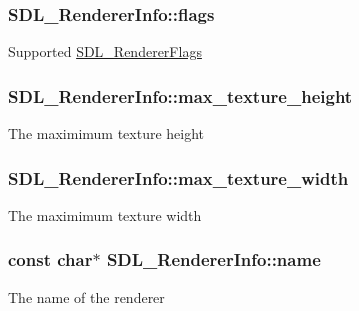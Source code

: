 \subsubsection[{flags}]{ S\+D\+L\+\_\+\+Renderer\+Info\+::flags}\label{struct_s_d_l___renderer_info_a95cf0ffd1704fd0a4dd8ceac6c9f0542}
Supported \hyperlink{_s_d_l__render_8h_a3a6e51bbee5fd3f8ee0c9f7504ae4130}{S\+D\+L\+\_\+\+Renderer\+Flags} \hypertarget{struct_s_d_l___renderer_info_a87c6a13e8d535c2148f8913c05e13102}{}
\subsubsection[{max\+\_\+texture\+\_\+height}]{ S\+D\+L\+\_\+\+Renderer\+Info\+::max\+\_\+texture\+\_\+height}\label{struct_s_d_l___renderer_info_a87c6a13e8d535c2148f8913c05e13102}
The maximimum texture height \hypertarget{struct_s_d_l___renderer_info_a6e6757e3d5c1f0922adaba39380edfa6}{}
\subsubsection[{max\+\_\+texture\+\_\+width}]{ S\+D\+L\+\_\+\+Renderer\+Info\+::max\+\_\+texture\+\_\+width}\label{struct_s_d_l___renderer_info_a6e6757e3d5c1f0922adaba39380edfa6}
The maximimum texture width \hypertarget{struct_s_d_l___renderer_info_a433ecb2865c81ba9f28038e56a4ae6f3}{}
\subsubsection[{name}]{\setlength{\rightskip}{0pt plus 5cm}const char$\ast$ S\+D\+L\+\_\+\+Renderer\+Info\+::name}\label{struct_s_d_l___renderer_info_a433ecb2865c81ba9f28038e56a4ae6f3}
The name of the renderer \hypertarget{struct_s_d_l___renderer_info_acdec165b2053b914313f5996983ec6b8}{}
